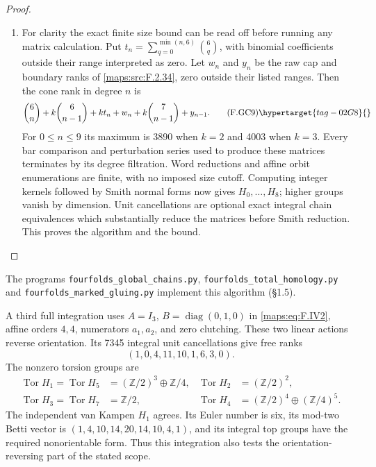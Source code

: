 \begin{proof}
\begin{enumerate}[label={$\langle1\rangle$\arabic*.}]
\item For clarity the exact finite size bound can be read off
before running any matrix calculation.  Put
$t_n=\sum_{q=0}^{\min(n,6)}\binom6q$, with binomial
coefficients outside their range interpreted as zero.
Let $w_n$ and $y_n$ be the raw cap and boundary ranks of
\ref{maps:src:F.2.34}, zero outside their listed ranges.  Then the cone rank
in degree $n$ is
\[
 \binom6n+k\binom6{n-1}+k t_n+w_n+
 k\binom7{n-1}+y_{n-1}.                                 \tag{F.GC9}\hypertarget{tag-02G8}{}\label{maps:eq:F.GC9}
\]
For $0\leq n\leq9$ its maximum is 3890 when $k=2$ and
4003 when $k=3$.  Every bar comparison and perturbation
series used to produce these matrices terminates by its
degree filtration.  Word reductions and affine orbit
enumerations are finite, with no imposed size cutoff.
Computing integer kernels followed by Smith normal forms
now gives $H_0,\ldots,H_8$; higher groups vanish by dimension.
Unit cancellations are optional exact integral chain
equivalences which substantially reduce the matrices before
Smith reduction.  This proves the algorithm and the bound.
\end{enumerate}
\end{proof}


The programs \texttt{fourfolds\_global\_chains.py}, \texttt{fourfolds\_total\_homology.py} and \texttt{fourfolds\_marked\_gluing.py} implement this algorithm (\S1.5).

A third full integration uses
$A=I_3$, $B=\operatorname{diag}(0,1,0)$ in \eqref{maps:eq:F.IV2},
affine orders $4,4$, numerators $a_1,a_2$, and zero
clutching.  These two linear actions reverse orientation.
Its 7345 integral unit cancellations give free ranks
\[
                  (1,0,4,11,10,1,6,3,0).
\]
The nonzero torsion groups are
\[
\begin{aligned}
 \operatorname{Tor}H_1=\operatorname{Tor}H_5
       &=(\mathbb Z/2)^3\oplus\mathbb Z/4,&
 \operatorname{Tor}H_2&=(\mathbb Z/2)^2,\\
 \operatorname{Tor}H_3=\operatorname{Tor}H_7
       &=\mathbb Z/2,&
 \operatorname{Tor}H_4&=(\mathbb Z/2)^4\oplus(\mathbb Z/4)^5.
\end{aligned}
\]
The independent van Kampen $H_1$ agrees.  Its Euler number
is six, its mod-two Betti vector is
$(1,4,10,14,20,14,10,4,1)$, and its integral top groups
have the required nonorientable form.  Thus this integration
also tests the orientation-reversing part of the stated scope.


